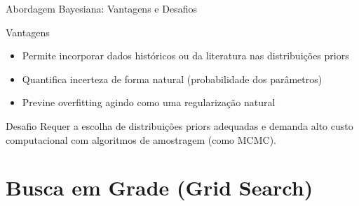 \begin{frame}{Abordagem Bayesiana: Vantagens e Desafios}
\begin{exampleblock}{Vantagens}
\begin{itemize}
    \item Permite incorporar dados históricos ou da literatura nas distribuições priors
    \item Quantifica incerteza de forma natural (probabilidade dos parâmetros)
    \item Previne overfitting agindo como uma regularização natural
\end{itemize}
\end{exampleblock}

\vspace{0.3cm}

\begin{alertblock}{Desafio}
Requer a escolha de distribuições priors adequadas e demanda alto custo computacional com algoritmos de amostragem (como MCMC).
\end{alertblock}
\end{frame}

\section{Busca em Grade (Grid Search)}

